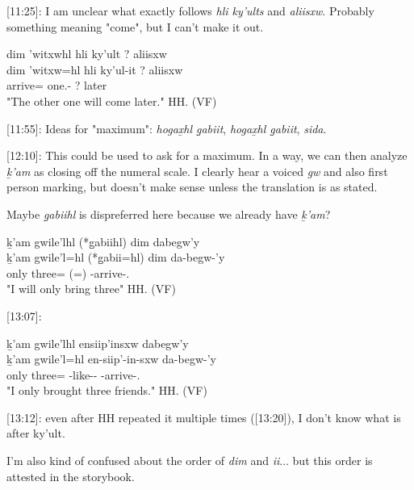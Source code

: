 [11:25]: I am unclear what exactly follows \textit{hli ky'ults} and \textit{aliisxw}. Probably something meaning "come", but I can't make it out.

\begin{exe}
    \ex \glll
    dim 'witxwhl hli ky'ult ? aliisxw\\
    dim 'witxw=hl hli ky'ul-it ? aliisxw \\
    \Prosp{} arrive=\Cn{} \Part{} one.\Hum{}-\Sx{} ? later \\
    \glt "The other one will come later." \hfill HH.\ElicitationDate{} (VF)
\end{exe}

[11:55]: Ideas for "maximum": \textit{hogax̱hl g̱abiit}, \textit{hogax̱hl g̱abiit}, \textit{sida}.

[12:10]: This could be used to ask for a maximum. In a way, we can then analyze \textit{ḵ'am} as closing off the numeral scale. I clearly hear a voiced \textit{gw} and also first person marking, but doesn't make sense unless the translation is as stated.

Maybe \textit{g̱abiihl} is dispreferred here because we already have \textit{ḵ'am}?

\begin{exe}
    \ex \glll
    ḵ'am gwile'lhl (*g̱abiihl) dim dabegw'y \\
    ḵ'am gwile'l=hl (*g̱abii=hl) dim da-begw-'y\\
    only three=\Cn{} (\Cnt{}=\Cn{}) \Prosp{} \Com{}-arrive-\Fsg{}.\Ii{} \\
    \glt "I will only bring three" \hfill HH.\ElicitationDate{} (VF)
\end{exe}

[13:07]:

\begin{exe}
    \ex \glll
    ḵ'am gwile'lhl ensiip'insxw dabegw'y \\
    ḵ'am gwile'l=hl en-siip'-in-sxw da-begw-'y \\
    only three=\Cn{} \Nmlz{}-like--\Antip{} \Com{}-arrive-\Fsg{}.\Ii{} \\
    \glt "I only brought three friends." \hfill HH.\ElicitationDate{} (VF)
\end{exe}

[13:12]: even after HH repeated it multiple times ([13:20]), I don't know what is after ky'ult.

I'm also kind of confused about the order of \textit{dim} and \textit{ii}... but this order is attested in the storybook.

